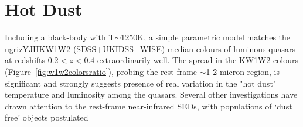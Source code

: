 


\section{Hot Dust}

Including a black-body with T$\sim$1250K, a simple parametric model matches the ugrizYJHKW1W2 (SDSS+UKIDSS+WISE) median colours of luminous quasars at redshifts $0.2 < z < 0.4$ extraordinarily well.
The spread in the KW1W2 colours (Figure~\ref{fig:w1w2colorsratio}), probing the rest-frame $\sim$1-2 micron region, is significant and strongly suggests presence of real variation in the "hot dust" temperature and luminosity among the quasars. 
Several other investigations have drawn attention to the rest-frame near-infrared SEDs, with populations of `dust free' objects postulated \citep{hao10,hao11,jiang10,mor11} 

